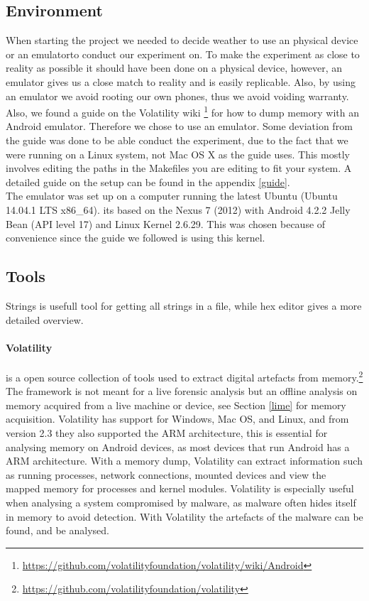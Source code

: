 \subsection{Environment}
When starting the project we needed to decide weather to use an physical device 
or an emulatorto conduct our experiment on. To make the experiment as close to 
reality as possible it should have been done on a physical device, however, an 
emulator gives us a close match to reality and is easily replicable. Also, by 
using an emulator we avoid rooting our own phones, thus we avoid voiding 
warranty. Also, we found a guide on the Volatility wiki
\footnote{\url{https://github.com/volatilityfoundation/volatility/wiki/Android}} 
for how to dump memory with an Android emulator. Therefore we chose to use an 
emulator. Some deviation from the guide was done to be able conduct the 
experiment, due to the fact that we were running on a Linux system, not Mac OS 
X as the guide uses. This mostly involves editing the paths in the Makefiles 
you are editing to fit your system. %
A detailed guide on the setup can be found in the appendix \ref{guide}.\\

The emulator was set up on a computer running the latest Ubuntu (Ubuntu 14.04.1 LTS x86\_64).
its based on the Nexus 7 (2012) with Android 4.2.2 Jelly Bean 
(API level 17) and Linux Kernel 2.6.29. This was chosen because of convenience
since the guide we followed is using this kernel.
\subsection{Tools}
Strings is usefull tool for getting all strings in a file, while hex editor gives a more detailed overview.
\paragraph{Volatility} is a open source collection of tools used to extract digital
  artefacts from memory.\footnote{\url{https://github.com/volatilityfoundation/volatility}} 
  The framework is not meant for a live forensic analysis but an offline analysis
  on memory acquired from a live machine or device, see Section \ref{lime} for
  memory acquisition. Volatility has support for Windows, Mac OS, and Linux, and
  from version 2.3 they also supported the ARM architecture, this is essential
  for analysing memory on Android devices, as most devices that run Android has a
  ARM architecture. With a memory dump, Volatility can extract information such as
  running processes, network connections, mounted devices and view the mapped
  memory for processes and kernel modules. Volatility is especially useful when
  analysing a system compromised by malware, as malware often hides itself in
  memory to avoid detection. With Volatility the artefacts of the malware can be
  found, and be analysed. \\
  
